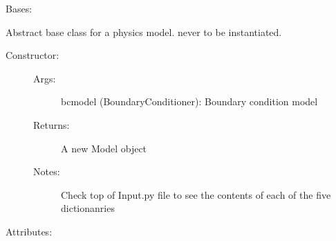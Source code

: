 \documentclass[letterpaper,10pt,english]{sphinxmanual}
\begin{document}
\begin{fulllineitems}
\label{\detokenize{autoapi/Model/index:Model.Model}}
\sphinxAtStartPar
Bases: 

\sphinxAtStartPar
Abstract base class for a physics model. never to be instantiated.
\begin{description}
\item[{Constructor:}] \leavevmode\begin{description}
\item[{Args:}] \leavevmode
\sphinxAtStartPar
bcmodel (BoundaryConditioner): Boundary condition model

\item[{Returns:}] \leavevmode
\sphinxAtStartPar
A new Model object

\item[{Notes:}] \leavevmode
\sphinxAtStartPar
Check top of Input.py file to see the contents of each of the five dictionanries

\end{description}

\end{description}

\sphinxAtStartPar
Attributes:

\begin{fulllineitems}
\label{\detokenize{autoapi/Model/index:Model.Model.init_state}}
\end{fulllineitems}


\begin{fulllineitems}
\label{\detokenize{autoapi/Model/index:Model.Model.get_flux}}
\end{fulllineitems}


\end{fulllineitems}
\end{document}
